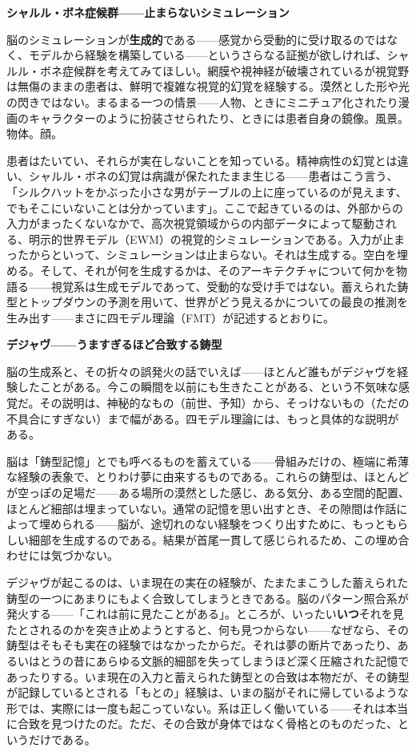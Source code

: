 \documentclass[11pt, twoside, openright]{book}
\begin{document}
\textbf{シャルル・ボネ症候群------止まらないシミュレーション}

脳のシミュレーションが\textbf{生成的}である------感覚から受動的に受け取るのではなく、モデルから経験を構築している------というさらなる証拠が欲しければ、シャルル・ボネ症候群を考えてみてほしい。網膜や視神経が破壊されているが視覚野は無傷のままの患者は、鮮明で複雑な視覚的幻覚を経験する。漠然とした形や光の閃きではない。まるまる一つの情景------人物、ときにミニチュア化されたり漫画のキャラクターのように扮装させられたり、ときには患者自身の鏡像。風景。物体。顔。

患者はたいてい、それらが実在しないことを知っている。精神病性の幻覚とは違い、シャルル・ボネの幻覚は病識が保たれたまま生じる------患者はこう言う、「シルクハットをかぶった小さな男がテーブルの上に座っているのが見えます、でもそこにいないことは分かっています」。ここで起きているのは、外部からの入力がまったくないなかで、高次視覚領域からの内部データによって駆動される、明示的世界モデル（EWM）の視覚的シミュレーションである。入力が止まったからといって、シミュレーションは止まらない。それは生成する。空白を埋める。そして、それが何を生成するかは、そのアーキテクチャについて何かを物語る------視覚系は生成モデルであって、受動的な受け手ではない。蓄えられた鋳型とトップダウンの予測を用いて、世界がどう見えるかについての最良の推測を生み出す------まさに四モデル理論（FMT）が記述するとおりに。

\textbf{デジャヴ------うますぎるほど合致する鋳型}

脳の生成系と、その折々の誤発火の話でいえば------ほとんど誰もがデジャヴを経験したことがある。今この瞬間を以前にも生きたことがある、という不気味な感覚だ。その説明は、神秘的なもの（前世、予知）から、そっけないもの（ただの不具合にすぎない）まで幅がある。四モデル理論には、もっと具体的な説明がある。

脳は「鋳型記憶」とでも呼べるものを蓄えている------骨組みだけの、極端に希薄な経験の表象で、とりわけ夢に由来するものである。これらの鋳型は、ほとんどが空っぽの足場だ------ある場所の漠然とした感じ、ある気分、ある空間的配置、ほとんど細部は埋まっていない。通常の記憶を思い出すとき、その隙間は作話によって埋められる------脳が、途切れのない経験をつくり出すために、もっともらしい細部を生成するのである。結果が首尾一貫して感じられるため、この埋め合わせには気づかない。

デジャヴが起こるのは、いま現在の実在の経験が、たまたまこうした蓄えられた鋳型の一つにあまりにもよく合致してしまうときである。脳のパターン照合系が発火する------「これは前に見たことがある」。ところが、いったい\textbf{いつ}それを見たとされるのかを突き止めようとすると、何も見つからない------なぜなら、その鋳型はそもそも実在の経験ではなかったからだ。それは夢の断片であったり、あるいはとうの昔にあらゆる文脈的細部を失ってしまうほど深く圧縮された記憶であったりする。いま現在の入力と蓄えられた鋳型との合致は本物だが、その鋳型が記録しているとされる「もとの」経験は、いまの脳がそれに帰しているような形では、実際には一度も起こっていない。系は正しく働いている------それは本当に合致を見つけたのだ。ただ、その合致が身体ではなく骨格とのものだった、というだけである。
\end{document}
